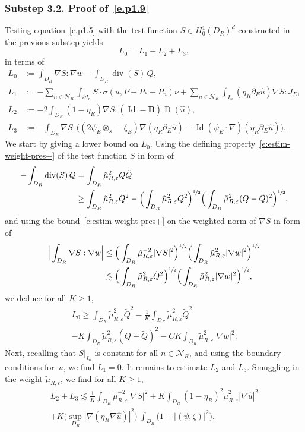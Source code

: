 \documentclass[JEP,XML,SOM,Unicode,published]{cedram}
\let\mathcal\mathscr
\theoremstyle{plain}
\theoremstyle{definition}
\newcommand{\e}{\varepsilon}
\newcommand{\Nc}{\mathcal N}
\newcommand{\Id}{\operatorname{Id}}
\newcommand{\D}{\operatorname{D}}
\newcommand{\Bb}{\bar{\boldsymbol B}}
\newcommand{\Div}{{\operatorname{div}}}
\newcommand{\substep}[1]{\subsubsection*{Substep #1}}
\begin{document}
\substep{3.2. Proof of~\eqref{e.p1.9}}
Testing equation~\eqref{e.p1.5} with the test function $S\in H^1_0(D_R)^d$ constructed in the previous substep yields
\[L_0=L_1+L_2+L_3,\]
in terms of
\begin{align*}
L_0&:= \int_{D_R} \nabla S : \nabla w -\int_{D_R} \Div(S)\, Q,\\
L_1&:= -\sum_{n\in\Nc_R}\int_{\partial I_n}S\cdot\sigma(u,P+P_*-P_n)\nu+\sum_{n\in\Nc_R}\int_{I_n}(\eta_R\partial_E\hat u)\nabla S:J_E,\\
L_2&:= -2\int_{D_R} (1-\eta_R)\nabla S : (\Id-\Bb )\D(\hat u),\\
L_3&:= -\int_{D_R}\nabla S:\Big((2\psi_E\otimes_s-\zeta_E)\nabla(\eta_R\partial_E\hat u)-\Id(\psi_E\cdot\nabla)(\eta_R\partial_E\hat u)\Big).
\end{align*}
We start by giving a lower bound on $L_0$.
Using the defining property~\eqref{e:estim-weight-pres+} of the test function $S$ in form of
\begin{align*}
-\int_{D_R} \Div (S)\, Q&=\int_{D_R} \tilde \mu_{R,\e}^2 Q \tilde Q\\
&\ge \int_{D_R} \tilde \mu_{R,\e}^2 \tilde Q^2-\Big(\int_{D_R} \tilde \mu_{R,\e}^2 \tilde Q^2\Big)^{\sfrac12}\Big(\int_{D_R} \tilde \mu_{R,\e}^2 (Q-\tilde Q)^2\Big)^{\sfrac12},
\end{align*}
and using the bound~\eqref{e:estim-weight-pres+} on the weighted norm of $\nabla S$ in form of
\begin{align*}
\Big|\int_{D_R} \nabla S : \nabla w\Big|&\le \Big(\int_{D_R} \tilde \mu_{R,\e}^{-2} |\nabla S|^2\Big)^{\sfrac12}\Big( \int_{D_R} \tilde \mu_{R,\e}^{2} |\nabla w|^2\Big)^{\sfrac12}\\
&\lesssim \Big( \int_{D_R} \tilde \mu_{R,\e}^2 \tilde Q^2\Big)^{\sfrac12}\Big(\int_{D_R} \tilde \mu_{R,\e}^{2} |\nabla w|^2\Big)^{\sfrac12},
\end{align*}
we deduce for all $K\ge1$,
\begin{multline}\label{eq:lowerbnd-L0}
L_0\ge \int_{D_R}\tilde\mu_{R,\e}^2\tilde Q^2-\frac1K\int_{D_R}\tilde\mu_{R,\e}^2\tilde Q^2\\[-5pt]
-K\int_{D_R}\tilde\mu_{R,\e}^2(Q-\tilde Q)^2-CK\int_{D_R}\tilde\mu_{R,\e}^2|\nabla w|^2.
\end{multline}
Next, recalling that $S|_{I_n}$ is constant for all $n\in\Nc_R$, and using the boundary conditions for~$u$, we find $L_1=0$.
It remains to estimate $L_2$ and $L_3$.
Smuggling in the weight $\tilde\mu_{R,\e}$, we find for all $K\ge1$,
\begin{multline*}
L_2+L_3\lesssim \frac1K\int_{D_R}\tilde\mu_{R,\e}^{-2}|\nabla S|^2
+K\int_{D_R}(1-\eta_R)^2\tilde\mu_{R,\e}^2|\nabla\hat u|^2\\
+K\Big(\sup_{D_R}|\nabla(\eta_R\nabla\hat u)|^2\Big)~\int_{D_R}\big(1+|(\psi,\zeta)|^2\big).
\end{multline*}
\end{document}
